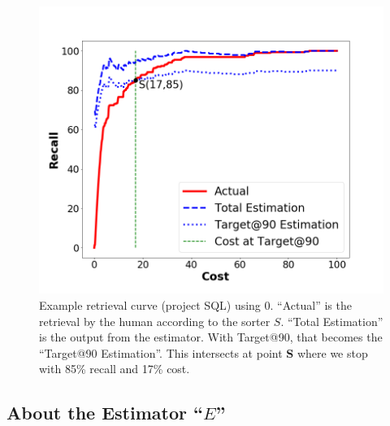 \documentclass[10pt,conference]{IEEEtran}
\newcommand{\bi}{\begin{itemize}}
\newcommand{\ei}{\end{itemize}}
\begin{document}
\begin{figure}[!t]
\begin{center}
\includegraphics[width=\linewidth]{estimation_sql.png}
\caption{Example retrieval curve (project SQL) using {\IT}0. ``Actual'' is the retrieval by the human according to the sorter $S$. ``Total Estimation'' is the output from the estimator. With Target@90, that becomes the ``Target@90 Estimation''. This intersects at point \textbf{S} where we stop with 85\% recall and 17\% cost.}
\label{fig framework example sql12}
\end{center}
\end{figure}

\subsection{About the Estimator ``$E$'' }



\end{document}
